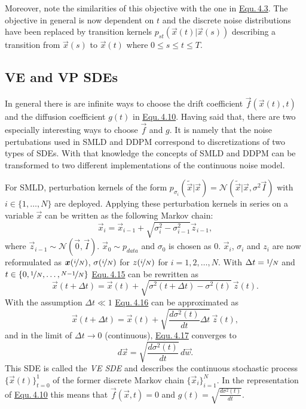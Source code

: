 Moreover, note the similarities of this objective with the one in \hyperref[equ:4.3]{Equ.\,4.3}. The objective in general is now dependent on $t$ and the discrete noise distributions have been replaced by transition kernels $p_{st}(\vec{x}(t)|\vec{x}(s))$ describing a transition from $\vec{x}(s)$ to $\vec{x}(t)$ where $0\leq s \leq t \leq T$.
%
\subsection{VE and VP SDEs} \label{sec:4.4.4}
In general there is are infinite ways to choose the drift coefficient $\vec{f}(\vec{x}(t),t)$ and the diffusion coefficient $g(t)$ in \hyperref[equ:4.10]{Equ.\,4.10}. Having said that, there are two especially interesting ways to choose $\vec{f}$ and $g$. It is namely that the noise pertubations used in SMLD and DDPM correspond to discretizations of two types of SDEs. With that knowledge the concepts of SMLD and DDPM can be transformed to two different implementations of the continuous noise model.

For SMLD, perturbation kernels of the form $p_{\sigma_i}(\tilde{\vec{x}}|\vec{x})=\mathcal{N}(\tilde{\vec{x}}|\vec{x},\sigma^2\vec{I})$ with $i\in\{1,\dots,N\}$ are deployed. Applying these perturbation kernels in series on a variable $\vec{x}$ can be written as the following Markov chain:
%
\begin{equation} \label{equ:4.15}
    \vec{x}_i=\vec{x}_{i-1}+\sqrt{\sigma_i^2-\sigma_{i-1}^2}\vec{z}_{i-1},
\end{equation}
%
where $\vec{z}_{i-1}\sim\mathcal{N}(\vec{0},\vec{I})$. $\vec{x}_0\sim p_{data}$ and $\sigma_0$ is chosen as $0$. $\vec{x}_i$, $\sigma_i$ and $z_i$ are now reformulated as $\vec{x}(\nicefrac{i}{N})$, $\sigma(\nicefrac{i}{N})$ for $z(\nicefrac{i}{N})$ for $i=1,2,\dots,N$. With $\Delta t=\nicefrac{1}{N}$ and $t\in\{0,\nicefrac{1}{N},\dots,\nicefrac{N-1}{N}\}$ \hyperref[equ:4.15]{Equ.\,4.15} can be rewritten as
%
\begin{equation} \label{equ:4.16}
    \vec{x}(t+\Delta t)=\vec{x}(t)+\sqrt{\sigma^2(t+\Delta t)-\sigma^2(t)}\,\vec{z}(t).
\end{equation}
%
With the assumption $\Delta t \ll 1$ \hyperref[equ:4.16]{Equ.\,4.16} can be approximated as 
%
\begin{equation} \label{equ:4.17}
    \vec{x}(t+\Delta t)=\vec{x}(t)+\sqrt{\frac{d\sigma^2(t)}{dt}\Delta t}\,\vec{z}(t),
\end{equation}
%
and in the limit of $\Delta t\rightarrow 0$ (continuous), \hyperref[equ:4.17]{Equ.\,4.17} converges to 
%
\begin{equation} \label{equ:4.18}
    d\vec{x}=\sqrt{\frac{d\sigma^2(t)}{dt}}\,d\vec{w}.
\end{equation}
%
This SDE is called the \textit{VE SDE} and describes the continuous stochastic process $\{\vec{x}(t)\}_{t=0}^1$ of the former discrete Markov chain $\{\vec{x}_i\}_{i=1}^N$. In the representation of \hyperref[equ:4.10]{Equ.\,4.10} this means that $\vec{f}(\vec{x},t)=0$ and $g(t)=\sqrt{\frac{d\sigma^2(t)}{dt}}$.

